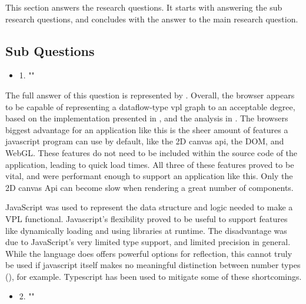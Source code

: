 This section answers the research questions. 
It starts with answering the sub research questions, and concludes with the answer to the main research question.

\subsection*{Sub Questions}

\begin{itemize}[ ]
  \item 1. "\mySubRQOne"
\end{itemize}

The full answer of this question is represented by .
Overall, the browser appears to be capable of representing a dataflow-type vpl graph to an acceptable degree, 
based on the implementation presented in , and the analysis in .
The browsers biggest advantage for an application like this is the sheer amount of features a javascript program can use by default, like the 2D canvas api, the DOM, and WebGL. 
These features do not need to be included within the source code of the application, leading to quick load times. 
All three of these features proved to be vital, and were performant enough to support an application like this. 
Only the 2D canvas Api can become slow when rendering a great number of components. 

JavaScript was used to represent the data structure and logic needed to make a VPL functional. 
Javascript's flexibility proved to be useful to support features like dynamically loading and using libraries at runtime. 
The disadvantage was due to JavaScript's very limited type support, and limited precision in general. 
While the language does offers powerful options for reflection, this cannot truly be used if javascript itself makes no meaningful distinction between number types (), for example. 
Typescript has been used to mitigate some of these shortcomings.  

\begin{itemize}[ ]
  \item 2. "\mySubRQTwo"
\end{itemize}


